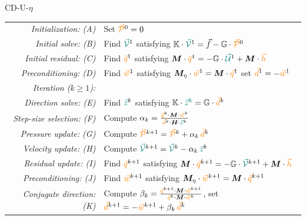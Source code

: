 \begin{algobox}{CD-U-$\eta$}
\begin{tabular}{@{}r@{\quad}l@{}}
\textit{Initialization: (A)} & Set ${\color{orange}\vec{\cal P}}^0 = 0$ \\
\textit{Initial solve: (B)} & Find ${\color{teal}\vec{\cal V}}^1$ satisfying ${\mathbb{K}} \cdot {\color{teal}\vec{\cal V}}^1 = \vec{f} - {\mathbb{G}} \cdot  {\color{orange} \vec{\cal P}}^0$ \\ [4pt]
\textit{Initial residual: (C)} & Find ${\color{orange}\vec{q}}^1$ satisfying ${\bm M} \cdot {\color{orange}\vec{q}}^1
= -{\mathbb{G}} \cdot {\color{teal}\vec{\cal U}}^1 + {\bm M} \cdot {\color{orange}\vec{h}} $ \\ [4pt]
\textit{Preconditioning: (D)} & Find ${\color{orange}\vec{w}}^1$ satisfying ${\bm M}_\eta \cdot {\color{orange}\vec{w}}^1 = {\bm M}\cdot {\color{orange}\vec{q}}^1$
\; set ${\color{orange}\vec{d}}^1 = -{\color{orange}\vec{w}}^1$ \\ [4pt]
\textit{Iteration ($k \geq 1$):} & \\[4pt]
\textit{Direction solve: (E)} & Find ${\color{teal}\vec{z}}^k$ satisfying ${\mathbb{K}} \cdot {\color{teal}\vec{z}^k} 
= {\mathbb{G}} \cdot {\color{orange}\vec{d}}^k$ \\ [4pt]
\textit{Step-size selection: (F)} & Compute $\alpha_k = \frac{ {\color{orange}\vec{q}}^k \cdot {\bm M} \cdot {\color{orange}\vec{w}}^k }{ {\color{orange} \vec{d}}^k\cdot {\bm H} \cdot {\color{teal} \vec{z}}^k  }$ \\ [4pt]
\textit{Pressure update: (G)} & Compute ${\color{orange}\vec{\cal P}}^{k+1} = {\color{orange}\vec{\cal P}}^k + \alpha_k\, {\color{orange}\vec{d}}^k$  \\ [4pt]
\textit{Velocity update: (H)} & Compute ${\color{teal}\vec{\cal V}}^{k+1} = {\color{teal}\vec{\cal V}}^k - \alpha_k\, {\color{teal}\vec{z}}^k$ \\ [4pt]
\textit{Residual update: (I)} & Find ${\color{orange} \vec{q}}^{k+1}$ satisfying ${\bm M}\cdot {\color{orange}\vec{q}}^{k+1}=
 -{\mathbb{G}} \cdot {\color{teal}\vec{\cal V}}^{k+1} + {\bm M} \cdot {\color{orange}\vec{h}} $ \\ [4pt]
\textit{Preconditioning: (J)} & Find ${\color{orange} \vec{w}}^{k+1}$ satisfying ${\bm M}_\eta \cdot {\color{orange}\vec{w}}^{k+1} = {\bm M}\cdot {\color{orange}\vec{q}}^{k+1}$ \\ [4pt]
\textit{Conjugate direction: (K)} & Compute $\beta_k = 
\frac{{\color{orange}\vec{q}}^{k+1} \cdot {\bm M} \cdot {\color{orange}\vec{w}}^{k+1}}
{ {\color{orange}\vec{q}}^k \cdot{\bm M} \cdot {\color{orange}\vec{w}}^k }
$, \; set ${\color{orange}\vec{d}}^{k+1} = -{\color{orange}\vec{w}}^{k+1} + \beta_k\, {\color{orange}\vec{d}}^k$
\end{tabular} 
\end{algobox}

